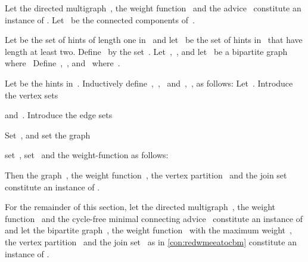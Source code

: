 \begin{construction}
  \label{con:redwmeeatocbm}
  Let the directed multigraph~, the weight function~ and the advice~ constitute an instance of \pWMEECCLAs . Let~ be the connected components of~.
  
  Let  be the set of hints of length one in~ and let~ be the set of hints in~ that have length at least two. Define~ by the set~. Let~,~, and let~ be a bipartite graph where~ Define~,~, and~ where~.

  Let  be the hints in~. Inductively define~,~,~ and~,~, as follows: Let~. Introduce the vertex sets 

and~. Introduce the edge sets

Set~, and set the graph

set~, set~ and the weight-function as follows:  

Then the graph~, the weight function~, the vertex partition~ and the join set~ constitute an instance of \pCBMs .\end{construction}

For the remainder of this section, let the directed multigraph~, the weight function~ and the cycle-free minimal connecting advice~ constitute an instance of \pWMEECCLAs{} and let the bipartite graph~, the weight function~ with the maximum weight~, the vertex partition~ and the join set~ as in \autoref{con:redwmeeatocbm} constitute an instance of \pCBMs{}.

